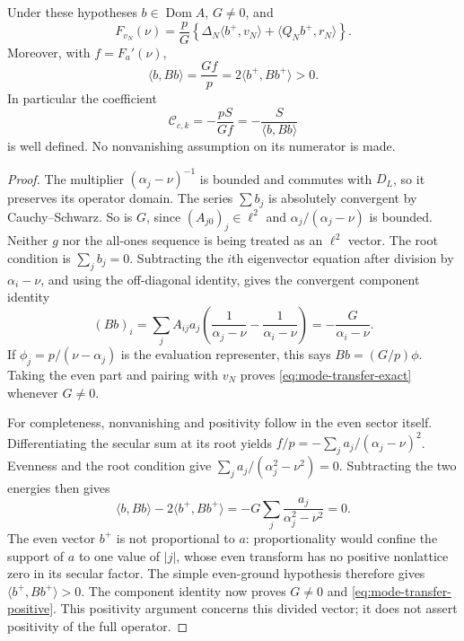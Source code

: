 \begin{proposition}
\label{prop:mode-transfer-adjoint}
Under these hypotheses $b\in\operatorname{Dom}A$, $G\ne0$, and
\begin{equation}\label{eq:mode-transfer-exact}
 F_{v_N}(\nu)=\frac pG\left\{
   \Delta_N\langle b^+,v_N\rangle+\langle Q_Nb^+,r_N\rangle\right\}.
\end{equation}
Moreover, with $f=F_a'(\nu)$,
\begin{equation}\label{eq:mode-transfer-positive}
 \langle b,Bb\rangle=\frac{Gf}{p}
     =2\langle b^+,Bb^+\rangle>0.
\end{equation}
In particular the coefficient
\begin{equation}\label{eq:mode-transfer-coefficient}
 \mathcal C_{c,k}=-\frac{pS}{Gf}
       =-\frac{S}{\langle b,Bb\rangle}
\end{equation}
is well defined. No nonvanishing assumption on its numerator is made.
\end{proposition}
\begin{proof}
The multiplier $(\alpha_j-\nu)^{-1}$ is bounded and commutes with $D_L$,
so it preserves its operator domain. The series $\sum b_j$ is absolutely
convergent by Cauchy--Schwarz. So is $G$, since $(A_{j0})_j\in\ell^2$
and $\alpha_j/(\alpha_j-\nu)$ is bounded. Neither $g$ nor the all-ones
sequence is being treated as an $\ell^2$ vector.
The root condition is $\sum_j b_j=0$. Subtracting the $i$th eigenvector
equation after division by $\alpha_i-\nu$, and using the off-diagonal
identity, gives the convergent component identity
\[
 (Bb)_i=\sum_j A_{ij}a_j
 \left(\frac1{\alpha_j-\nu}-\frac1{\alpha_i-\nu}\right)
 =-\frac G{\alpha_i-\nu}.
\]
If $\phi_j=p/(\nu-\alpha_j)$ is the evaluation representer, this says
$Bb=(G/p)\phi$. Taking the even part and pairing with $v_N$ proves
\eqref{eq:mode-transfer-exact} whenever $G\ne0$.

For completeness, nonvanishing and positivity follow in the even sector
itself. Differentiating the secular sum at its root yields
$f/p=-\sum_j a_j/(\alpha_j-\nu)^2$. Evenness and the root condition give
$\sum_j a_j/(\alpha_j^2-\nu^2)=0$. Subtracting the two energies then gives
\[
 \langle b,Bb\rangle-2\langle b^+,Bb^+\rangle
 =-G\sum_j\frac{a_j}{\alpha_j^2-\nu^2}=0.
\]
The even vector $b^+$ is not proportional to $a$: proportionality would
confine the support of $a$ to one value of $|j|$, whose even transform
has no positive nonlattice zero in its secular factor. The simple
even-ground hypothesis therefore gives $\langle b^+,Bb^+\rangle>0$.
The component identity now proves $G\ne0$ and
\eqref{eq:mode-transfer-positive}. This positivity argument concerns
this divided vector; it does not assert positivity of the full operator.
\end{proof}


